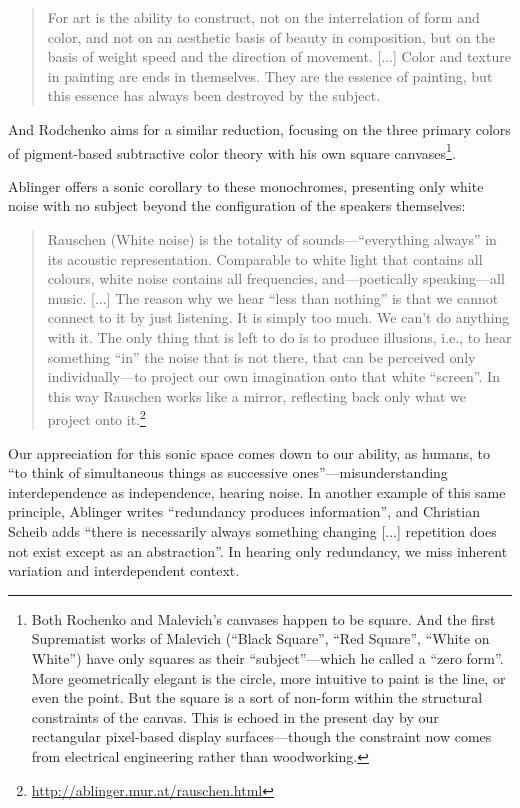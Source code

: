 \documentclass{thesis}
\begin{document}
	\begin{quote}
	For art is the ability to construct, not on the interrelation of form and color, and not on an aesthetic basis of beauty in composition, but on the basis of weight speed and the direction of movement. [...] Color and texture in painting are ends in themselves. They are the essence of painting, but this essence has always been destroyed by the subject.
	\end{quote}
	
And Rodchenko aims for a similar reduction, focusing on the three primary colors of pigment-based subtractive color theory with his own square canvases\footnote{Both Rochenko and Malevich's canvases happen to be square. And the first Suprematist works of Malevich (``Black Square'', ``Red Square'', ``White on White'') have only squares as their ``subject''---which he called a ``zero form''. More geometrically elegant is the circle, more intuitive to paint is the line, or even the point. But the square is a sort of non-form within the structural constraints of the canvas. This is echoed in the present day by our rectangular pixel-based display surfaces---though the constraint now comes from electrical engineering rather than woodworking.}.

Ablinger offers a sonic corollary to these monochromes, presenting only white noise with no subject beyond the configuration of the speakers themselves:

	\begin{quote}
	Rauschen (White noise) is the totality of sounds---``everything always'' in its acoustic representation. Comparable to white light that contains all colours, white noise contains all frequencies, and---poetically speaking---all music. [...] The reason why we hear ``less than nothing'' is that we cannot connect to it by just listening. It is simply too much. We can't do anything with it. The only thing that is left to do is to produce illusions, i.e., to hear something ``in'' the noise that is not there, that can be perceived only individually---to project our own imagination onto that white ``screen''. In this way Rauschen works like a mirror, reflecting back only what we project onto it.\footnote{\url{http://ablinger.mur.at/rauschen.html}}
	\end{quote}
	
Our appreciation for this sonic space comes down to our ability, as humans, to ``to think of simultaneous things as successive ones''\cite{christian_scheib_statics_????}---misunderstanding interdependence as independence, hearing noise. In another example of this same principle, Ablinger writes ``redundancy produces information'', and Christian Scheib adds ``there is necessarily always something changing [...] repetition does not exist except as an abstraction''. In hearing only redundancy, we miss inherent variation and interdependent context.
	
\end{document}
